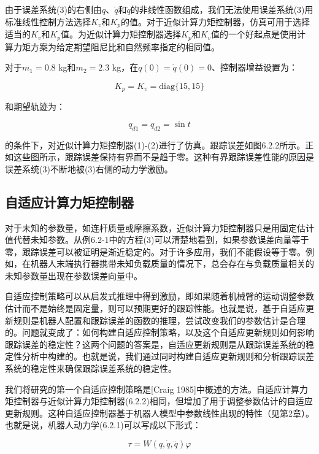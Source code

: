 \documentclass[12pt,a4paper]{ctexart}
\begin{document}
由于误差系统(3)的右侧由$q$、$\dot{q}$和$\ddot{q}$的非线性函数组成，我们无法使用误差系统(3)用标准线性控制方法选择$K_v$和$K_p$的值。对于近似计算力矩控制器，仿真可用于选择适当的$K_v$和$K_p$值。为近似计算力矩控制器选择$K_p$和$K_v$值的一个好起点是使用计算力矩方案为给定期望阻尼比和自然频率指定的相同值。

对于$m_1 = 0.8$ kg和$m_2 = 2.3$ kg，在$q(0) = \dot{q}(0) = 0$、控制器增益设置为：

\begin{equation}
K_p = K_v = \text{diag}\{15, 15\}
\end{equation}

和期望轨迹为：

\begin{equation}
q_{d1} = q_{d2} = \sin t
\end{equation}

的条件下，对近似计算力矩控制器(1)-(2)进行了仿真。跟踪误差如图6.2.2所示。正如这些图所示，跟踪误差保持有界而不是趋于零。这种有界跟踪误差性能的原因是误差系统(3)不断地被(3)右侧的动力学激励。

\subsection*{自适应计算力矩控制器}

对于未知的参数量，如连杆质量或摩擦系数，近似计算力矩控制器只是用固定估计值代替未知参数。从例6.2-1中的方程(3)可以清楚地看到，如果参数误差向量等于零，跟踪误差可以被证明是渐近稳定的。对于许多应用，我们不能假设等于零。例如，在机器人末端执行器携带未知负载质量的情况下，总会存在与负载质量相关的未知参数量出现在参数误差向量中。

自适应控制策略可以从启发式推理中得到激励，即如果随着机械臂的运动调整参数估计而不是始终是固定量，则可以预期更好的跟踪性能。也就是说，基于自适应更新规则是机器人配置和跟踪误差的函数的推理，尝试改变我们的参数估计是合理的。问题就变成了：如何构建自适应控制策略，以及这个自适应更新规则如何影响跟踪误差的稳定性？这两个问题的答案是，自适应更新规则是从跟踪误差系统的稳定性分析中构建的。也就是说，我们通过同时构建自适应更新规则和分析跟踪误差系统的稳定性来确保跟踪误差系统的稳定性。

我们将研究的第一个自适应控制策略是[Craig 1985]中概述的方法。自适应计算力矩控制器与近似计算力矩控制器(6.2.2)相同，但增加了用于调整参数估计的自适应更新规则。这种自适应控制器基于机器人模型中参数线性出现的特性（见第2章）。也就是说，机器人动力学(6.2.1)可以写成以下形式：

\begin{equation}\label{eq:linear-params}
\tau = W(q, \dot{q}, \ddot{q}) \varphi
\end{equation}
\end{document}
